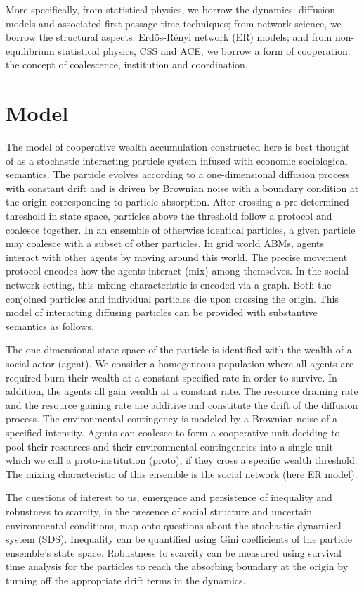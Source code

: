 More specifically, from statistical physics, we borrow the dynamics: diffusion models and associated first-passage time techniques; from network science, we borrow the structural aspects: Erd\H{o}s-R\'{e}nyi network (ER) models; and from non-equilibrium statistical physics, CSS and ACE, we borrow a form of cooperation: the concept of coalescence, institution and coordination. 


\section{Model}
The model of cooperative wealth accumulation constructed here is best thought of as a stochastic interacting particle system infused with economic sociological semantics. The particle evolves according to a one-dimensional diffusion process with constant drift and is driven by Brownian noise with a boundary condition at the origin corresponding to particle absorption. After crossing a pre-determined threshold in state space, particles above the threshold follow a protocol and coalesce together. In an ensemble of otherwise identical particles, a given particle may coalesce with a subset of other particles. In grid world ABMs, agents interact with other agents by moving around this world. The precise movement protocol encodes how the agents interact (mix) among themselves. In the social network setting, this mixing characteristic is encoded via a graph. Both the conjoined particles and individual particles die upon crossing the origin. This model of interacting diffusing particles can be provided with substantive semantics as follows. 

The one-dimensional state space of the particle is identified with the wealth of a social actor (agent). We consider a homogeneous population where all agents are required burn their wealth at a constant specified rate in order to survive. In addition, the agents all gain wealth at a constant rate. The resource draining rate and the resource gaining rate are additive and constitute the drift of the diffusion process. The environmental contingency is modeled by a Brownian noise of a specified intensity. Agents can coalesce to form a cooperative unit deciding to pool their resources and their environmental contingencies into a single unit which we call a proto-institution (proto), if they cross a specific wealth threshold. The mixing characteristic of this ensemble is the social network (here ER model).          

The questions of interest to us, emergence and persistence of inequality and robustness to scarcity, in the presence of social structure and uncertain environmental conditions, map onto questions about the stochastic dynamical system (SDS). Inequality can be quantified using Gini coefficients of the particle ensemble's state space. Robustness to scarcity can be measured using survival time analysis for the particles to reach the absorbing boundary at the origin by turning off the appropriate drift terms in the dynamics. 

